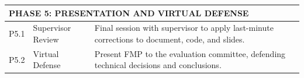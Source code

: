 \begin{table}[htbp]
\begin{tabularx}{\textwidth}{l l X}
    \multicolumn{3}{l}{\textbf{PHASE 5: PRESENTATION AND VIRTUAL DEFENSE}} \\
    \midrule
    P5.1 & Supervisor Review & Final session with supervisor to apply last-minute corrections to document, code, and slides. \\
    P5.2 & Virtual Defense & Present FMP to the evaluation committee, defending technical decisions and conclusions. \\
    \bottomrule
\end{tabularx}
\end{table}



